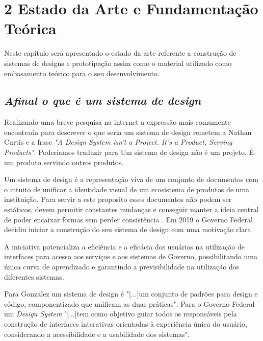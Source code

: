 \chapter[Capítulo 2]{2 Estado da Arte e Fundamentação Teórica}
\label{ch:cap2}

  Neste capítulo será apresentado o estado da arte referente a construção de sistemas de designs e prototipação assim como o material utilizado como embasamento teórico para o seu desenvolvimento.

\section[\textit{Seção}]{\textit{Afinal o que é um sistema de design}}
  Realizando uma breve pesquisa na internet a expressão mais comumente encontrada para descrever o que seria um sistema de design remetem a Nathan Curtis e a frase \textit{"A Design System isn’t a Project. It’s a Product, Serving Products".} \cite{descricao_sistema_design} Poderiamos traduzir para Um sistema de design não é um projeto. É um produto servindo outros produtos.

  Um sistema de design é a representação viva de um conjunto de documentos com o intuito de unificar a identidade visual de um ecosistema de produtos de uma instituição. Para servir a este proposito esses documentos não podem ser estáticos, devem permitir constantes mudanças e conseguir manter a ideia central de poder encaixar formas sem perder consistência \cite{design_gov_digital}.
  Em 2019 o Governo Federal decidiu iniciar a construção do seu sistema  de design com uma motivação clara

\begin{citacao}[brazil]
  [...]A iniciativa potencializa a eficiência e a eficácia dos usuários na utilização de interfaces para acesso aos serviços e aos sistemas de Governo, possibilitando uma única curva de aprendizado e garantindo a previsibilidade na utilização dos diferentes sistemas. \cite{design_gov_federal}
\end{citacao}

  Para Gonzalez um sistema de design é "[...]um conjunto de padrões para design e código, componentizado que unificam as duas práticas". \cite{GuilhermeGonzalez} Para o Governo Federal um \textit{Design System} "[...]tem como objetivo guiar todos os responsáveis pela construção de interfaces interativas orientadas à experiência única do usuário, considerando a acessibilidade e a usabilidade dos sistemas". \cite{design_gov_federal}

